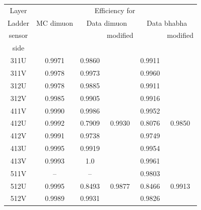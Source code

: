 \documentclass[xcolor=dvipsnames]{beamer}
\begin{document}
 \begin{frame}
 	
 	
 	\begin{center}	
 		\begin{tabular}{|c|c|c| c|c|c|}
 			\hline
 			
 			Layer &	\multicolumn{5}{|c|}{Efficiency for }	\\ 
 			\cline{2-6}
 			Ladder &\multicolumn{1}{|c|}{MC dimuon }&\multicolumn{2}{|c|}{Data dimuon }&\multicolumn{2}{|c|}{Data bhabha }	\\ \cline{2-6} 			
 			sensor &&&modified&&modified\\
 			side &&&&&\\ \cline{2-6}	
 			\hline
 		311U &   0.9971  & 0.9860  &           &  0.9911 &          \\          
 		311V &   0.9978  & 0.9973  &           &  0.9960 &          \\  
 		312U &   0.9978  & 0.9885  &           &  0.9911 &          \\  
 		312V &   0.9985  & 0.9905  &           &  0.9916 &          \\  
 		\hline
 		411V &   0.9990  & 0.9986  &           &  0.9952 &          \\  
 		412U &   0.9992  & 0.7909  & 0.9930    &  0.8076 & 0.9850   \\  
 		412V &   0.9991  & 0.9738  &           &  0.9749 &          \\  
 		413U &   0.9995  & 0.9919  &           &  0.9954 &          \\  
 		413V &   0.9993  & 1.0     &           &  0.9961 &          \\  
 		
 		\hline
 		511V &   --      & --      &           &  0.9803 &          \\  
 		512U &   0.9995  & 0.8493  &  0.9877   &  0.8466 &  0.9913  \\  
 		512V &   0.9989  & 0.9931  &           &  0.9826 &          \\
 				  
 				\end{tabular}
 				
 			\end{center}
 			
 		\end{frame}
 			
\end{document}
